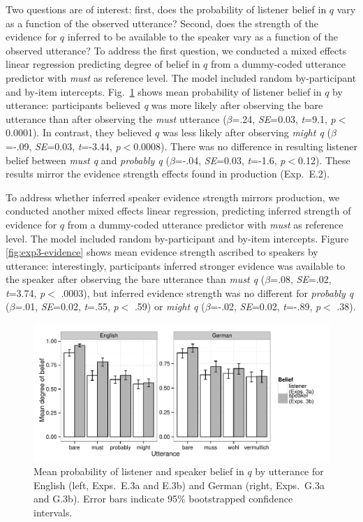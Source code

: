 \documentclass[11pt]{article}
\newcommand{\figref}[1]{Figure \ref{#1}}
\begin{document}
Two questions are of interest: first, does the probability of listener belief in $q$ vary as a function of the observed utterance? Second, does the strength of the evidence for $q$ inferred to be available to the speaker vary as a function of the observed utterance? To address the first question, we conducted a mixed effects linear regression predicting degree of belief in $q$ from a dummy-coded utterance predictor with \emph{must} as reference level. The model included random by-participant and by-item intercepts. Fig.~\ref{fig:expt3} shows mean probability of listener belief in $q$ by utterance: participants believed \emph{q} was more likely after observing the bare utterance than after observing the \emph{must} utterance   ($\beta$=.24, \emph{SE}=0.03, \emph{t}=9.1, \emph{p}$<$0.0001). In contrast, they believed $q$ was less likely after observing \emph{might q} ($\beta$=-.09, \emph{SE}=0.03, \emph{t}=-3.44, \emph{p}$<$0.0008). There was no difference in resulting listener belief between \emph{must q} and \emph{probably q} ($\beta$=-.04, \emph{SE}=0.03, \emph{t}=-1.6, \emph{p}$<$0.12). These results mirror the evidence strength effects found in production (Exp.~E.2). 

To address whether inferred speaker evidence strength mirrors production, we conducted another mixed effects linear regression, predicting inferred strength of evidence for $q$ from a dummy-coded utterance predictor with \emph{must} as reference level. The model included random by-participant and by-item intercepts.  \figref{fig:exp3-evidence} shows mean evidence strength ascribed to speakers by utterance:  interestingly, participants inferred stronger evidence was available to the speaker after observing the bare utterance than \emph{must q} ($\beta$=.08, \emph{SE}=.02, \emph{t}=3.74, \emph{p}$<$ .0003), but inferred evidence strength was no different for \emph{probably q} ($\beta$=.01, \emph{SE}=0.02, \emph{t}=.55, \emph{p}$<$ .59) or \emph{might q} ($\beta$=-.02, \emph{SE}=0.02, \emph{t}=-.89, \emph{p}$<$ .38).

\begin{figure}
	\centering
	\includegraphics[width=\textwidth]{pics/mean-beliefs}
	\caption{Mean probability of listener and speaker belief in $q$ by utterance for English (left, Exps.~E.3a and E.3b) and German (right, Exps.~G.3a and G.3b). Error bars indicate 95\% bootstrapped confidence intervals.}
	\label{fig:expt3}
\end{figure}
\end{document}
